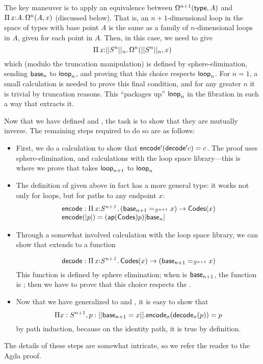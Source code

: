 The key maneuver is to apply an equivalence between
$\Omega^{n+1}(\mathsf{type},A)$ and $\textnormal{$\Pi$}\,\mathit{x} \mathit{:} \mathit{A}.\,\mathit{}{\Omega^n(A,x)}$
(discussed below).  That is,
an $n+1$-dimensional loop in the space of types with base point $A$ is
the same as a family of $n$-dimensional loops in $A$, given for each
point in $A$.  Then, in this case, we need to give 
\[
\textnormal{$\Pi$}\,\mathit{x} \mathit{:} \mathit{||S^n||_n}.\,\mathit{}{\Omega^n(||S^n||_n,x)}
\]
which (modulo the truncation manipulation) is defined by
sphere-elimination, sending $\mathsf{base}_n$ to $\mathsf{loop}_n$, and
proving that this choice respects $\mathsf{loop}_n$.  For $n=1$, a small
calculation is needed to prove this final condition, and for any greater $n$
it is trivial by truncation reasons.  This ``packages up''
$\mathsf{loop}_n$ in the  fibration in such a way that
 extracts it.    

Now that we have defined  and , the task is to
show that they are mutually inverse.  The remaining steps required to do
so are as follows:
\begin{itemize}
\item First, we do a calculation to show that
  $\mathsf{encode'}(\mathsf{decode'} c) = c$.  The proof uses
  sphere-elimination, and calculations with the loop space
  library---this is where we prove that  takes
  $\mathsf{loop}_{n+1}$  to $\mathsf{loop}_n$

\item The definition of  given above in fact has a more
  general type: it works not only for loops, but for paths to any
  endpoint $x$:
\[
\begin{array}{l}
\mathsf{encode} : \textnormal{$\Pi$}\,\mathit{x} \mathit{:} \mathit{S^{n+1}}.\,\mathit{} (\mathsf{base}_{n+1} =_{S^{n+1}} x) \to \mathsf{Codes}(x)\\
\mathsf{encode}(|p|) = (\mathsf{ap}(\mathsf{Codes}) p) |\mathsf{base}_n|
\end{array}
\]

\item Through a somewhat involved calculation with the loop space library,
  we can show that  extends to a function

\[
\mathsf{decode} : \textnormal{$\Pi$}\,\mathit{x} \mathit{:} \mathit{S^{n+1}}.\,\mathit{} \mathsf{Codes}(x) \to (\mathsf{base}_{n+1} =_{S^{n+1}} x)
\]
This function is defined by sphere elimination; 
when  is $\mathsf{base}_{n+1}$, the function is ; then
we have to prove that this choice respects the . 

\item Now that we have generalized to  and , it
  is easy to show that 
  \[
  \Pi x : S^{n+1}, p : || \mathsf{base}_{n+1} = x ||.  \mathsf{encode}_x(\mathsf{decode}_x(p)) = p
  \] by path
  induction, because on the identity path, it is true by definition.
\end{itemize}
%
The details of these steps are somewhat intricate, so we refer the
reader to the Agda proof.  

